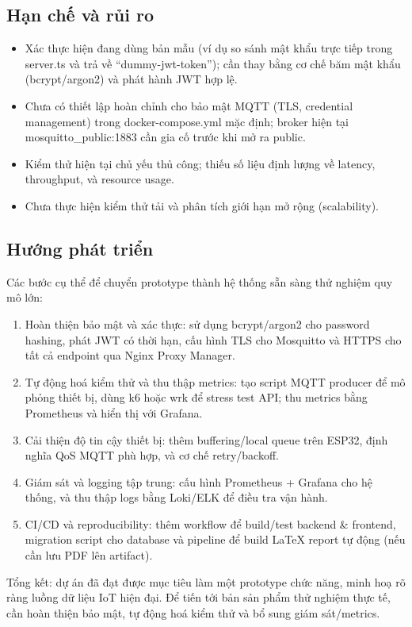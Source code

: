 \subsection*{Hạn chế và rủi ro}
\begin{itemize}
    \item Xác thực hiện đang dùng bản mẫu (ví dụ so sánh mật khẩu trực tiếp trong server.ts và trả về “dummy-jwt-token”); cần thay bằng cơ chế băm mật khẩu (bcrypt/argon2) và phát hành JWT hợp lệ.
    \item Chưa có thiết lập hoàn chỉnh cho bảo mật MQTT (TLS, credential management) trong docker-compose.yml mặc định; broker hiện tại mosquitto\_public:1883 cần gia cố trước khi mở ra public.
    \item Kiểm thử hiện tại chủ yếu thủ công; thiếu số liệu định lượng về latency, throughput, và resource usage.
    \item Chưa thực hiện kiểm thử tải và phân tích giới hạn mở rộng (scalability).
\end{itemize}

\subsection*{Hướng phát triển}
Các bước cụ thể để chuyển prototype thành hệ thống sẵn sàng thử nghiệm quy mô lớn:
\begin{enumerate}
    \item Hoàn thiện bảo mật và xác thực: sử dụng bcrypt/argon2 cho password hashing, phát JWT có thời hạn, cấu hình TLS cho Mosquitto và HTTPS cho tất cả endpoint qua Nginx Proxy Manager.
    \item Tự động hoá kiểm thử và thu thập metrics: tạo script MQTT producer để mô phỏng thiết bị, dùng k6 hoặc wrk để stress test API; thu metrics bằng Prometheus và hiển thị với Grafana.
    \item Cải thiện độ tin cậy thiết bị: thêm buffering/local queue trên ESP32, định nghĩa QoS MQTT phù hợp, và cơ chế retry/backoff.
    \item Giám sát và logging tập trung: cấu hình Prometheus + Grafana cho hệ thống, và thu thập logs bằng Loki/ELK để điều tra vận hành.
    \item CI/CD và reproducibility: thêm workflow để build/test backend \& frontend, migration script cho database và pipeline để build LaTeX report tự động (nếu cần lưu PDF lên artifact).
\end{enumerate}

Tổng kết: dự án đã đạt được mục tiêu làm một prototype chức năng, minh hoạ rõ ràng luồng dữ liệu IoT hiện đại. Để tiến tới bản sản phẩm thử nghiệm thực tế, cần hoàn thiện bảo mật, tự động hoá kiểm thử và bổ sung giám sát/metrics.

